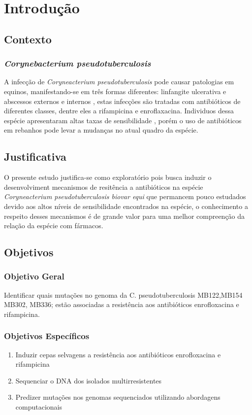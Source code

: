 \chapter{Introdução}
\label{cap:introducao}

\section{Contexto}
\subsection{\textit{Corynebacterium pseudotuberculosis}}

A infecção de \textit{Coryneacterium pseudotuberculosis} pode causar patologias em equinos, manifestando-se em três formas diferentes: linfangite ulcerativa e abscessos externos e internos \cite{aleman1996}, estas infecções são tratadas com antibióticos de diferentes classes, dentre eles a rifampicina e enroflaxacina. 
Individuos dessa espécie apresentaram altas taxas de sensibilidade \cite{rhodes2015}, porém o uso de antibióticos em rebanhos pode levar a mudanças no atual quadro
da espécie. 

\section{Justificativa}
O presente estudo justifica-se como exploratório pois busca induzir o desenvolviment mecanismos de resitência a antibióticos na espécie 
\textit{Coryneacterium pseudotuberculosis biovar equi} que permancem pouco estudados devido aos altos níveis de sensibilidade
encontrados na espécie, o conhecimento a respeito desses mecanismos é de grande valor para uma melhor compreenção da relação da espécie com fármacos.

\section{Objetivos}

\subsection{Objetivo Geral}

Identificar quais mutações no genoma da C. pseudotuberculosis MB122,MB154 MB302, MB336; estão associadas a resistência aos antibióticos enrofloxacina e rifampicina.

\subsection{Objetivos Específicos}
\begin{enumerate}
    \item Induzir cepas selvagens a resistência aos antibióticos enrofloxacina e rifampicina
    \item Sequenciar o DNA dos isolados multirresistentes
    \item Predizer mutações nos genomas sequenciados utilizando abordagens computacionais
\end{enumerate}

